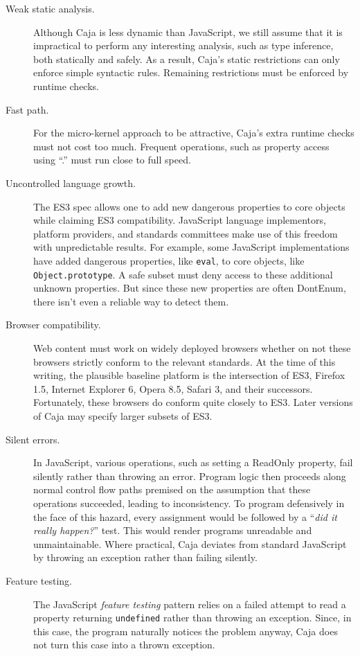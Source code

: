 \documentclass[letterpaper,twocolumn,10pt]{article}
\newcommand{\code}[1]{{\tt {#1}}}              %
\begin{document}
\begin{description}
  \item[Weak static analysis.] Although Caja is less dynamic than JavaScript, 
  we still assume that it is impractical to perform any interesting analysis, 
  such as type inference, both statically and safely. As a result, Caja's 
  static restrictions can only enforce simple syntactic rules. Remaining 
  restrictions must be enforced by runtime checks.
  
  \item[Fast path.] For the micro-kernel approach to be attractive, Caja's 
  extra runtime checks must not cost too much. Frequent operations, such as 
  property access using ``.'' must run close to full speed.
  
  \item[Uncontrolled language growth.] The ES3 spec allows one to add new 
  dangerous properties to core objects while claiming ES3 compatibility. 
  JavaScript language implementors, platform providers, and standards 
  committees make use of this freedom with unpredictable results. For 
  example, some JavaScript implementations have added dangerous properties, 
  like \code{eval}, to core objects, like \code{Object.prototype}. A safe 
  subset must deny access to these additional unknown properties. But since 
  these new properties are often DontEnum, there isn't even a reliable way to 
  detect them.
  
  \item[Browser compatibility.] Web content must work on widely deployed 
  browsers whether on not these browsers strictly conform to the relevant 
  standards. At the time of this writing, the plausible baseline platform is 
  the intersection of ES3, Firefox 1.5, Internet Explorer 6, Opera 8.5, 
  Safari 3, and their successors. Fortunately, these browsers do conform 
  quite closely to ES3. Later versions of Caja may specify larger subsets of 
  ES3.
  
  \item[Silent errors.] In JavaScript, various operations, such as setting a 
  ReadOnly property, fail silently rather than throwing an error. Program 
  logic then proceeds along normal control flow paths premised on the 
  assumption that these operations succeeded, leading to inconsistency. To 
  program defensively in the face of this hazard, every assignment would be 
  followed by a ``\emph{did it really happen?}'' test. This would render 
  programs unreadable and unmaintainable. Where practical, Caja deviates from 
  standard JavaScript by throwing an exception rather than failing silently.
  
  \item[Feature testing.] The JavaScript \emph{feature testing} pattern 
  relies on a failed attempt to read a property returning \code{undefined} 
  rather than throwing an exception. Since, in this case, the program 
  naturally notices the problem anyway, Caja does not turn this case into a 
  thrown exception.
    
\end{description}
\end{document}
